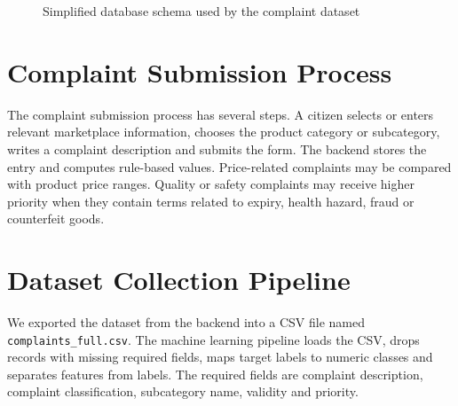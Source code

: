\documentclass[12pt,a4paper,openany]{book}
\begin{document}
\begin{figure}[H]
\centering
{}
\caption{Simplified database schema used by the complaint dataset}
\label{fig:db_schema}
\end{figure}

\section{Complaint Submission Process}
The complaint submission process has several steps. A citizen selects or enters relevant marketplace information, chooses the product category or subcategory, writes a complaint description and submits the form. The backend stores the entry and computes rule-based values. Price-related complaints may be compared with product price ranges. Quality or safety complaints may receive higher priority when they contain terms related to expiry, health hazard, fraud or counterfeit goods.

\section{Dataset Collection Pipeline}
We exported the dataset from the backend into a CSV file named \texttt{complaints\_}\allowbreak\texttt{full.csv}. The machine learning pipeline loads the CSV, drops records with missing required fields, maps target labels to numeric classes and separates features from labels. The required fields are complaint description, complaint classification, subcategory name, validity and priority.
\end{document}
